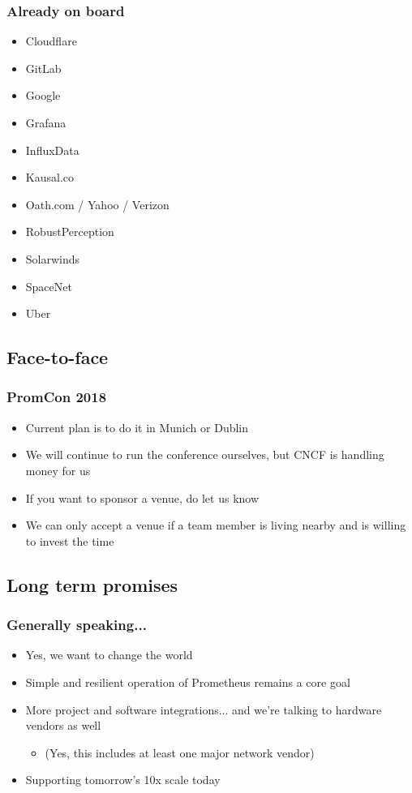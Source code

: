 \documentclass[t]{beamer}
\begin{document}
\begin{frame}
	\frametitle{Already on board}
	\begin{itemize}
		\item Cloudflare
		\item GitLab
		\item Google
		\item Grafana
		\item InfluxData
		\item Kausal.co
		\item Oath.com / Yahoo / Verizon
		\item RobustPerception
		\item Solarwinds
		\item SpaceNet
		\item Uber
	\end{itemize}
\end{frame}


\subsection{Face-to-face}

\begin{frame}
	\frametitle{PromCon 2018}
	\begin{itemize}
		\item Current plan is to do it in Munich or Dublin
		\item We will continue to run the conference ourselves, but CNCF is handling money for us
		\item If you want to sponsor a venue, do let us know
		\item We can only accept a venue if a team member is living nearby and is willing to invest the time
	\end{itemize}
\end{frame}


\subsection{Long term promises}

\begin{frame}
	\frametitle{Generally speaking...}
	\begin{itemize}
		\item Yes, we want to change the world
		\item Simple and resilient operation of Prometheus remains a core goal
		\item More project and software integrations... and we're talking to hardware vendors as well
		\begin{itemize}
			\item (Yes, this includes at least one major network vendor)
		\end{itemize}
		\item Supporting tomorrow's 10x scale today
	\end{itemize}
\end{frame}
\end{document}
